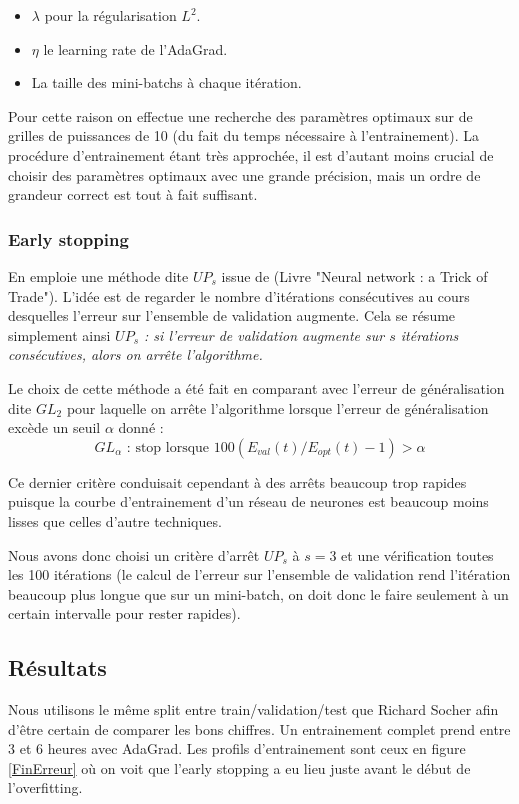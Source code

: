 \documentclass[conference]{IEEEtran}
\begin{document}
\begin{itemize}
\item $\lambda$ pour la régularisation $L^2$.
\item $\eta$ le learning rate de l'AdaGrad.
\item La taille des mini-batchs à chaque itération.
\end{itemize}

Pour cette raison on effectue une recherche des paramètres optimaux sur de grilles de puissances de 10 (du fait du temps nécessaire à l'entrainement). La procédure d'entrainement étant très approchée, il est d'autant moins crucial de choisir des paramètres optimaux avec une grande précision, mais un ordre de grandeur correct est tout à fait suffisant.

\subsubsection{Early stopping}
En emploie une méthode dite $UP_s$ issue de \cite{Prechelt97earlystopping} (Livre "Neural network : a Trick of Trade"). L'idée est de regarder le nombre d'itérations consécutives au cours desquelles l'erreur sur l'ensemble de validation augmente. Cela se résume simplement ainsi \emph{$UP_s$ : si l'erreur de validation augmente sur $s$ itérations consécutives, alors on arrête l'algorithme.}

Le choix de cette méthode a été fait en comparant avec l'erreur de généralisation dite $GL_2$ pour laquelle on arrête l'algorithme lorsque l'erreur de généralisation excède un seuil $\alpha$ donné :
$$GL_\alpha\mbox{ : stop lorsque $100(E_{val}(t)/E_{opt}(t)-1)>\alpha$}$$

Ce dernier critère conduisait cependant à des arrêts beaucoup trop rapides puisque la courbe d'entrainement d'un réseau de neurones est beaucoup moins lisses que celles d'autre techniques.

Nous avons donc choisi un critère d'arrêt $UP_s$ à $s=3$ et une vérification toutes les 100 itérations (le calcul de l'erreur sur l'ensemble de validation rend l'itération beaucoup plus longue que sur un mini-batch, on doit donc le faire seulement à un certain intervalle pour rester rapides).

\subsection{Résultats}
Nous utilisons le même split entre train/validation/test que Richard Socher afin d'être certain de comparer les bons chiffres. Un entrainement complet prend entre 3 et 6 heures avec AdaGrad. Les profils d'entrainement sont ceux en figure \ref{FinErreur} où on voit que l'early stopping a eu lieu juste avant le début de l'overfitting.
\end{document}
